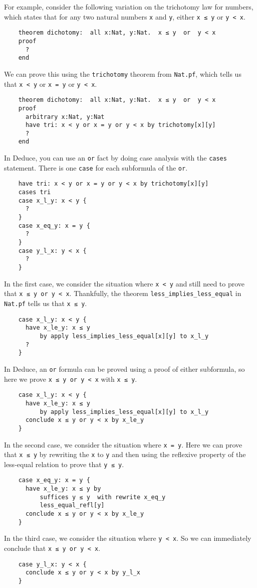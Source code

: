 \documentclass[12pt]{article}
\begin{document}
For example, consider the following variation on the trichotomy law
for numbers, which states that for any two natural numbers \texttt{x}
and \texttt{y}, either \texttt{x ≤ y} or \texttt{y < x}.

\begin{verbatim}
    theorem dichotomy:  all x:Nat, y:Nat.  x ≤ y  or  y < x
    proof
      ?
    end
\end{verbatim}
We can prove this using the \texttt{trichotomy} theorem from
\texttt{Nat.pf}, which tells us that \texttt{x < y} or \texttt{x = y}
or \texttt{y < x}.
\begin{verbatim}
    theorem dichotomy:  all x:Nat, y:Nat.  x ≤ y  or  y < x
    proof
      arbitrary x:Nat, y:Nat
      have tri: x < y or x = y or y < x by trichotomy[x][y]
      ?
    end
\end{verbatim}
In Deduce, you can use an \texttt{or} fact by doing case analysis with
the \texttt{cases} statement. There is one \texttt{case} for each
subformula of the \texttt{or}.
\begin{verbatim}
    have tri: x < y or x = y or y < x by trichotomy[x][y]
    cases tri
    case x_l_y: x < y {
      ?
    }
    case x_eq_y: x = y {
      ?
    }
    case y_l_x: y < x {
      ?
    }
\end{verbatim}
In the first case, we consider the situation where \texttt{x < y} and
still need to prove that \texttt{x ≤ y or y < x}. Thankfully, the
theorem \texttt{less\_implies\_less\_equal} in \texttt{Nat.pf} tells us
that \texttt{x ≤ y}.
\begin{verbatim}
    case x_l_y: x < y {
      have x_le_y: x ≤ y
          by apply less_implies_less_equal[x][y] to x_l_y
      ?
    }
\end{verbatim}

In Deduce, an \texttt{or} formula can be proved using a proof of either
subformula, so here we prove \texttt{x ≤ y or y < x} with \texttt{x ≤ y}.
\begin{verbatim}
    case x_l_y: x < y {
      have x_le_y: x ≤ y
          by apply less_implies_less_equal[x][y] to x_l_y
      conclude x ≤ y or y < x by x_le_y
    }
\end{verbatim}
In the second case, we consider the situation where \texttt{x =
  y}. Here we can prove that \texttt{x ≤ y} by rewriting the
\texttt{x} to \texttt{y} and then using the reflexive property of the
less-equal relation to prove that \texttt{y ≤ y}.
\begin{verbatim}
    case x_eq_y: x = y {
      have x_le_y: x ≤ y by
          suffices y ≤ y  with rewrite x_eq_y
          less_equal_refl[y]
      conclude x ≤ y or y < x by x_le_y
    }
\end{verbatim}
In the third case, we consider the situation where \texttt{y < x}.
So we can immediately conclude that \texttt{x ≤ y or y < x}.
\begin{verbatim}
    case y_l_x: y < x {
      conclude x ≤ y or y < x by y_l_x
    }
\end{verbatim}
\end{document}
